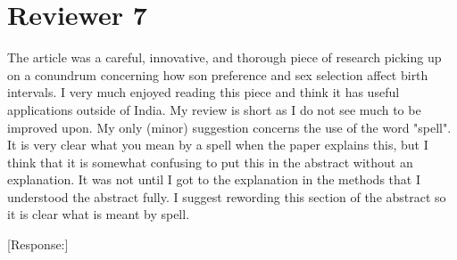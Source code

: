 \documentclass[letterpaper,12pt]{article}
\begin{document}
\section*{Reviewer 7}

The article was a careful, innovative, and thorough piece of research
picking up on a conundrum concerning how son preference and sex
selection affect birth intervals. I very much enjoyed reading this piece
and think it has useful applications outside of India.  My review is
short as I do not see much to be improved upon.  My only (minor)
suggestion concerns the use of the word "spell".  It is very clear what
you mean by a spell when the paper explains this, but I think that it is
somewhat confusing to put this in the abstract without an explanation. 
It was not until I got to the explanation in the methods that I
understood the abstract fully.  I suggest rewording this section of the
abstract so it is clear what is meant by spell.

[Response:]



\newpage


\end{document}
